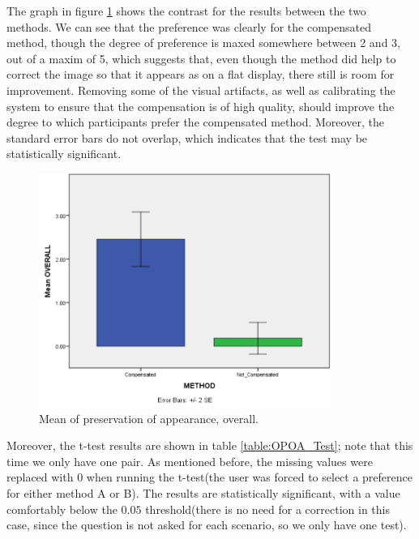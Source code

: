 \documentclass[]{article}
\begin{document}
The graph in figure \ref{fig:OPOA_Graph} shows the contrast for the results between the two methods. We can see that the preference was clearly for the compensated method, though the degree of preference is maxed somewhere between 2 and 3, out of a maxim of 5, which suggests that, even though the method did help to correct the image so that it appears as on a flat display, there still is room for improvement. Removing some of the visual artifacts, as well as calibrating the system to ensure that the compensation is of high quality, should improve the degree to which participants prefer the compensated method. Moreover, the standard error bars do not overlap, which indicates that the test may be statistically significant. 

\begin{figure}[!h]
    \centering
    \includegraphics[width=0.85\textwidth]{figures/results/OPOA_Graph.PNG}
    \caption{Mean of preservation of appearance, overall.}
    \label{fig:OPOA_Graph}
\end{figure}

Moreover, the t-test results are shown in table \ref{table:OPOA_Test}; note that this time we only have one pair. As mentioned before, the missing values were replaced with 0 when running the t-test(the user was forced to select a preference for either method A or B). The results are statistically significant, with a value comfortably below the $0.05$ threshold(there is no need for a correction in this case, since the question is not asked for each scenario, so we only have one test). 

\end{document}
